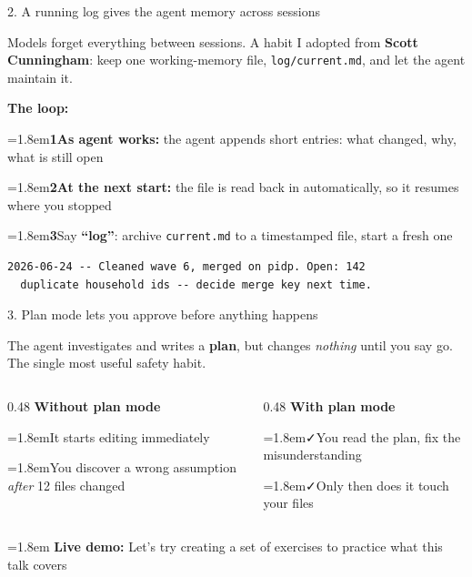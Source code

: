 \documentclass[aspectratio=169, 11pt, t]{beamer}
\newcommand{\mk}[1]{\textcolor{seeblau}{\textbf{#1}}}
\newcommand{\yes}{\textcolor{seeblau}{\faCheck}}
\newcommand{\warn}{\textcolor{akzentrot}{\faExclamationTriangle}}
\newcommand{\hint}[2]{\par\noindent\hangindent=1.8em\hangafter=1\textcolor{seeblau}{#1}\quad #2\par}
\newcommand{\liveicon}{\colorbox{seeblau}{\textcolor{white}{\,\faTerminal\,}}}  %
\begin{document}
\begin{frame}[fragile]{2. A running log gives the agent memory across sessions}

\small
Models forget everything between sessions. A habit I adopted from \textbf{Scott Cunningham}: keep one working-memory file, \texttt{log/current.md}, and let the agent maintain it.

\vspace{0.5em}
\textbf{The loop:}\\[0.1em]
\hint{\textcolor{seeblau}{\textbf{1}}}{\textbf{As agent works:} the agent appends short entries: what changed, why, what is still open}
\hint{\textcolor{seeblau}{\textbf{2}}}{\textbf{At the next start:} the file is read back in automatically, so it resumes where you stopped}
\hint{\textcolor{seeblau}{\textbf{3}}}{Say \mk{\enquote{log}}: archive \texttt{current.md} to a timestamped file, start a fresh one}

\vspace{0.3em}
\begin{lstlisting}
2026-06-24 -- Cleaned wave 6, merged on pidp. Open: 142
  duplicate household ids -- decide merge key next time.
\end{lstlisting}

\end{frame}


\begin{frame}{3. Plan mode lets you approve before anything happens}

\small
The agent investigates and writes a \textbf{plan}, but changes \emph{nothing} until you say go. The single most useful safety habit.

\vfill
\begin{columns}[T]
  \begin{column}{0.48\textwidth}
    \textbf{Without plan mode}\\[0.4em]
    \hint{\warn}{It starts editing immediately}
    \hint{\warn}{You discover a wrong assumption \emph{after} 12 files changed}
  \end{column}
  \begin{column}{0.48\textwidth}
    \textbf{With plan mode}\\[0.4em]
    \hint{\yes}{You read the plan, fix the misunderstanding}
    \hint{\yes}{Only then does it touch your files}
  \end{column}
\end{columns}

\vfill
\hint{\liveicon}{\textbf{Live demo:} Let's try creating a set of exercises to practice what this talk covers}

\end{frame}
\end{document}
